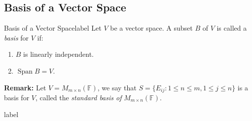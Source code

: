 \documentclass[12pt]{article}
\theoremstyle{definition}
\newcommand{\F}{\ensuremath{\mathbb{F}}}
\DeclareMathOperator{\Span}{Span}
\begin{document}
\subsection{Basis of a Vector Space}
\begin{definition}{Basis of a Vector Space}{}{label}
  Let $V$ be a vector space. A subset $B$ of $V$ is called a \emph{basis} for $V$ if:
  \begin{enumerate}
    \item $B$ is linearly independent.
    \item $\Span B = V$.
  \end{enumerate}
\end{definition}
\textbf{Remark: }Let $V = M_{m\times n}(\F)$, we say that $S = \{E_{ij} \colon 1 \leq n \leq m, 1 \leq j \leq n\}$ is a basis for $V$, called the \emph{standard basis of} $M_{m\times n}(\F)$.

\begin{theorem}{}{label}
  
\end{theorem}
\end{document}
